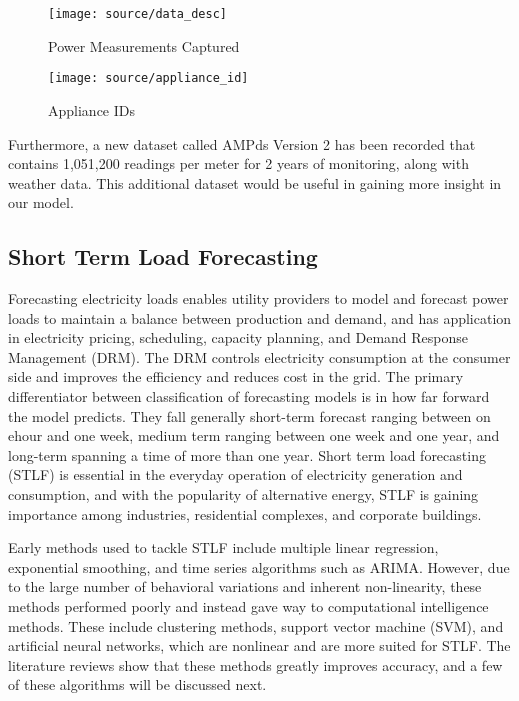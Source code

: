 \documentclass[11pt,twocolumn]{article}
\begin{document}
				\begin{figure}[!htbp]
					\centering
					\texttt{[image: source/data\_desc]}
					\caption{Power Measurements Captured}
					\label{fig:varnorm}
				\end{figure}

				\begin{figure}[!h]
					\centering
					\texttt{[image: source/appliance\_id]}
					\caption{Appliance IDs}
					\label{fig:varnorm}
				\end{figure}

				\quad Furthermore, a new dataset called AMPds Version 2 has been recorded that contains 1,051,200 readings per meter for 2 years of monitoring, along with weather data. This additional dataset would be useful in gaining more insight in our model. 

		\subsection{Short Term Load Forecasting}

			\quad Forecasting electricity loads enables utility providers to model and forecast power loads to maintain a balance between production and demand, and has application in electricity pricing, scheduling, capacity planning, and Demand Response Management (DRM). The DRM controls electricity consumption at the consumer side and improves the efficiency and reduces cost in the grid. The primary differentiator between classification of forecasting models is in how far forward the model predicts. They fall generally short-term forecast ranging between on ehour and one week, medium term ranging between one week and one year, and long-term spanning a time of more than one year. Short term load forecasting (STLF) is essential in the everyday operation of electricity generation and consumption, and with the popularity of alternative energy, STLF is gaining importance among industries, residential complexes, and corporate buildings. \newline

			\quad Early methods used to tackle STLF include multiple linear regression, exponential smoothing, and time series algorithms such as ARIMA. However, due to the large number of behavioral variations and inherent non-linearity, these methods performed poorly and instead gave way to computational intelligence methods. These include clustering methods, support vector machine (SVM), and artificial neural networks, which are nonlinear and are more suited for STLF. The literature reviews show that these methods greatly improves accuracy, and a few of these algorithms will be discussed next.
\end{document}
